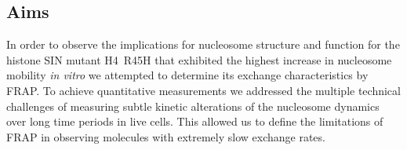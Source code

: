   \subsection{Aims}

    In order to observe the implications for nucleosome structure and function for
    the histone SIN mutant H4~R45H that exhibited the
    highest increase in nucleosome mobility \textit{in vitro}
    we attempted to determine its exchange characteristics by FRAP.
    To achieve quantitative measurements we addressed the multiple technical challenges 
    of measuring subtle kinetic alterations of the nucleosome dynamics 
    over long time periods in live cells. This allowed us to define 
    the limitations of FRAP in observing molecules with extremely slow exchange rates.
